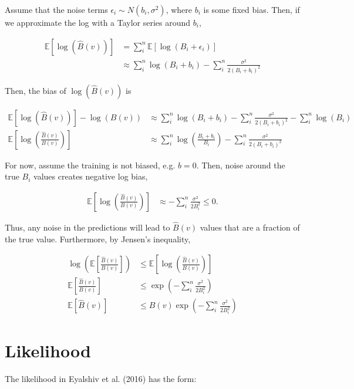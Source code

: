 \documentclass[11pt]{article}
\newcommand{\E}{\mathbb{E}}
\begin{document}
Assume that the noise terms $\epsilon_i \sim N(b_i, \sigma^2)$, where $b_i$ is
some fixed bias. Then, if we approximate the log with a Taylor series around
$b_i$,

\begin{align*}
  \E[\log(\hat{B}(v))] &= \sum_i^n \E[\log(B_i + \epsilon_i)]  \\
                       &\approx \sum_i^n \log(B_i + b_i) - \sum_i^n \frac{\sigma^2}{2(B_i + b_i)^2} 
\end{align*}

Then, the bias of $\log(\hat{B}(v))$ is

\begin{align*}
  \E[\log(\hat{B}(v))] - \log(B(v)) &\approx \sum_i^n \log(B_i + b_i) - \sum_i^n \frac{\sigma^2}{2(B_i + b_i)^2} - \sum_i^n \log(B_i) \\
  \E\left[\log\left(\frac{\hat{B}(v)}{B(v)}\right)\right]   &\approx \sum_i^n \log\left(\frac{B_i + b_i}{B_i}\right) - \sum_i^n \frac{\sigma^2}{2(B_i + b_i)^2} 
\end{align*}

For now, assume the training is not biased, e.g. $b=0$. Then, noise around the
true $B_i$ values creates negative log bias, 

\begin{align*}
  \E\left[\log\left(\frac{\hat{B}(v)}{B(v)}\right)\right]   &\approx - \sum_i^n \frac{\sigma^2}{2B_i^2} \le 0.
\end{align*}

Thus, any noise in the predictions will lead to $\hat{B}(v)$ values that are a
fraction of the true value. Furthermore, by Jensen's inequality,

\begin{align*}
  \log\left(\E\left[\frac{\hat{B}(v)}{B(v)}\right]\right)  &\le \E\left[\log\left(\frac{\hat{B}(v)}{B(v)}\right)\right]    \\
  \E\left[\frac{\hat{B}(v)}{B(v)}\right]  &\le \exp \left(- \sum_i^n \frac{\sigma^2}{2B_i^2} \right) \\
  \E[\hat{B}(v)]  &\le B(v) \exp \left(- \sum_i^n \frac{\sigma^2}{2B_i^2} \right)
\end{align*}

\section*{Likelihood}

The likelihood in Eyalshiv et al. (2016) has the form: 
\end{document}
